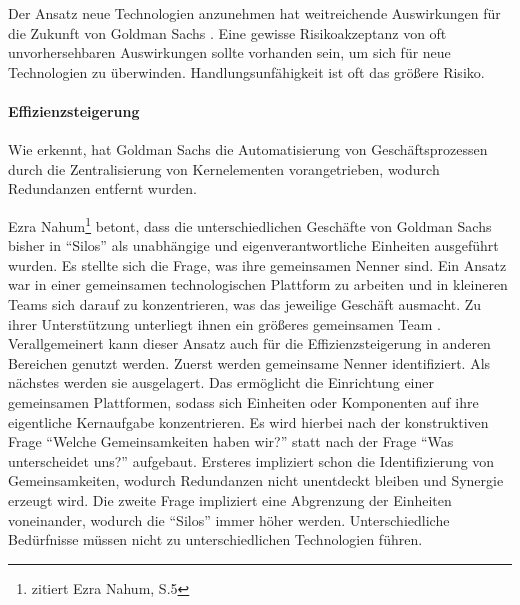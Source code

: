 Der Ansatz neue Technologien anzunehmen hat weitreichende Auswirkungen für die Zukunft von Goldman Sachs \cite{Gupta:2017}. Eine gewisse Risikoakzeptanz von oft unvorhersehbaren Auswirkungen sollte vorhanden sein, um sich für neue Technologien zu überwinden. Handlungsunfähigkeit ist oft das größere Risiko. 

\paragraph{Effizienzsteigerung}
Wie \citet{Gupta:2017} erkennt, hat Goldman Sachs die Automatisierung von Geschäftsprozessen durch die Zentralisierung von Kernelementen vorangetrieben, wodurch Redundanzen entfernt wurden. 

Ezra Nahum\footnote{\citet{Gupta:2017} zitiert Ezra Nahum, S.5} betont, dass die unterschiedlichen Geschäfte von Goldman Sachs bisher in \enquote{Silos} als unabhängige und eigenverantwortliche Einheiten ausgeführt wurden. Es stellte sich die Frage, was ihre gemeinsamen Nenner sind. Ein Ansatz war in einer gemeinsamen technologischen Plattform zu arbeiten und in kleineren Teams sich darauf zu konzentrieren, was das jeweilige Geschäft ausmacht. Zu ihrer Unterstützung unterliegt ihnen ein größeres gemeinsamen Team \cite{Gupta:2017}.
\bigskip
\\
Verallgemeinert kann dieser Ansatz auch für die Effizienzsteigerung in anderen Bereichen genutzt werden. Zuerst werden gemeinsame Nenner identifiziert. Als nächstes werden sie ausgelagert. Das ermöglicht die Einrichtung einer gemeinsamen Plattformen, sodass sich Einheiten oder Komponenten auf ihre eigentliche Kernaufgabe konzentrieren. Es wird hierbei nach der konstruktiven Frage \enquote{Welche Gemeinsamkeiten haben wir?} statt nach der Frage \enquote{Was unterscheidet uns?} aufgebaut. Ersteres impliziert schon die Identifizierung von Gemeinsamkeiten, wodurch Redundanzen nicht unentdeckt bleiben und Synergie erzeugt wird. Die zweite Frage impliziert eine Abgrenzung der Einheiten voneinander, wodurch die \enquote{Silos} immer höher werden. Unterschiedliche Bedürfnisse müssen nicht zu unterschiedlichen Technologien führen. 

